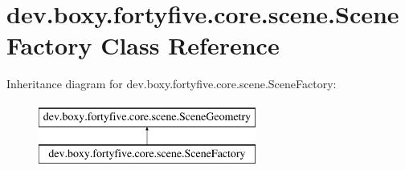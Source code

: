\hypertarget{classdev_1_1boxy_1_1fortyfive_1_1core_1_1scene_1_1_scene_factory}{
\section{dev.boxy.fortyfive.core.scene.SceneFactory Class Reference}
\label{d4/d69/classdev_1_1boxy_1_1fortyfive_1_1core_1_1scene_1_1_scene_factory}
}
Inheritance diagram for dev.boxy.fortyfive.core.scene.SceneFactory:\begin{figure}[H]
\begin{center}
\leavevmode
\includegraphics[height=2.000000cm]{d4/d69/classdev_1_1boxy_1_1fortyfive_1_1core_1_1scene_1_1_scene_factory}
\end{center}
\end{figure}
